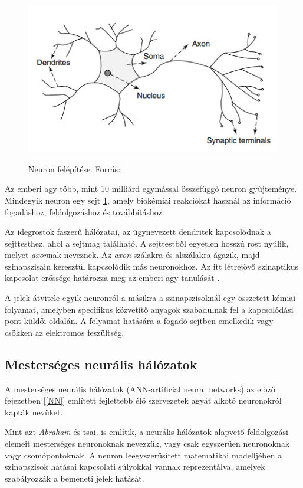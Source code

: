 \documentclass[12pt,a4]{article}
\begin{document}
    \begin{figure}[h]	
		\centering
		\includegraphics[width=1\linewidth]{neuron1}
        \label{fig:neuron1}
		\caption{Neuron felépítése. 
			Forrás:\cite{ann}}
	\end{figure}
 
	Az emberi agy több, mint 10 milliárd egymással összefüggő neuron gyűjteménye. Mindegyik neuron egy sejt \ref{fig:neuron1}, amely biokémiai reakciókat használ az információ fogadáshoz, feldolgozáshoz és továbbításhoz.
	
	Az idegrostok faszerű hálózatai, az úgynevezett dendritek kapcsolódnak a sejttesthez, ahol a sejtmag található. A sejttestből egyetlen hosszú rost nyúlik, melyet \textit{axon}nak neveznek. Az \textit{axon} szálakra és alszálakra ágazik, majd szinapszisain keresztül kapcsolódik más neuronokhoz. Az itt létrejövő szinaptikus kapcsolat erőssége határozza meg az emberi agy tanulását\cite{ann} .
	
	A jelek átvitele egyik neuronról a másikra a szinapszisoknál egy összetett kémiai folyamat, amelyben specifikus közvetítő anyagok szabadulnak fel a kapcsolódási pont küldői oldalán. A folyamat hatására a fogadó sejtben emelkedik vagy csökken az elektromos feszültség.
	
	\newpage
	\subsection{Mesterséges neurális hálózatok}
	A mesterséges neurális hálózatok (ANN-artificial neural networks) az előző fejezetben [\autoref{NN}] említett fejlettebb élő szervezetek agyát alkotó neuronokról kapták nevüket. 
	
	Mint azt \textit{Abraham} és tsai. \cite{ann} is említik, a neurális hálózatok alapvető feldolgozási elemeit mesterséges neuronoknak nevezzük, vagy csak egyszerűen neuronoknak vagy csomópontoknak. A neuron leegyszerűsített matematikai modelljében a szinapszisok hatásai kapcsolati súlyokkal vannak reprezentálva, amelyek szabályozzák a bemeneti jelek hatását.
	
\end{document}
